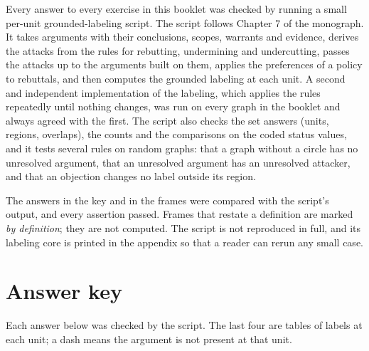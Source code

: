 \documentclass[11pt]{article}
\newcounter{fr}
\newcounter{ex}
\begin{document}
Every answer to every exercise in this booklet was checked by running a small per-unit grounded-labeling script. The script follows Chapter 7 of the monograph. It takes arguments with their conclusions, scopes, warrants and evidence, derives the attacks from the rules for rebutting, undermining and undercutting, passes the attacks up to the arguments built on them, applies the preferences of a policy to rebuttals, and then computes the grounded labeling at each unit. A second and independent implementation of the labeling, which applies the rules repeatedly until nothing changes, was run on every graph in the booklet and always agreed with the first. The script also checks the set answers (units, regions, overlaps), the counts and the comparisons on the coded status values, and it tests several rules on random graphs: that a graph without a circle has no unresolved argument, that an unresolved argument has an unresolved attacker, and that an objection changes no label outside its region.

The answers in the key and in the frames were compared with the script's output, and every assertion passed. Frames that restate a definition are marked \emph{by definition}; they are not computed. The script is not reproduced in full, and its labeling core is printed in the appendix so that a reader can rerun any small case.

\section{Answer key}\label{sec:key}

Each answer below was checked by the script. The last four are tables of labels at each unit; a dash means the argument is not present at that unit.
\end{document}
